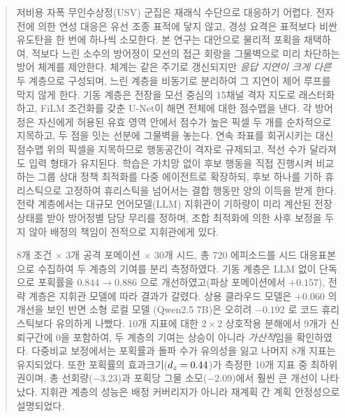 \begin{abstract}
\noindent
저비용 자폭 무인수상정(USV) 군집은 재래식 수단으로 대응하기 어렵다. 전자전에 의한 연성
대응은 유선 조종 표적에 닿지 않고, 경성 요격은 표적보다 비싼 유도탄을 한 번에 하나씩
소모한다. 본 연구는 대안으로 물리적 포획을 채택하여, 적보다 느린 소수의 방어정이 모선의
접근 회랑을 그물벽으로 미리 차단하는 방어 체계를 제안한다. 체계는 같은 주기로 갱신되지만
\emph{응답 지연이 크게 다른} 두 계층으로 구성되며, 느린 계층을 비동기로 분리하여 그 지연이
제어 루프를 막지 않게 한다. 기동 계층은 전장을 모선 중심의 15채널 격자 지도로 래스터화하고,
FiLM 조건화를 갖춘 U-Net이 해면 전체에 대한 점수맵을 낸다. 각 방어정은 자신에게 허용된
유효 영역 안에서 점수가 높은 픽셀 두 개를 순차적으로 지목하고, 두 점을 잇는 선분에
그물벽을 놓는다. 연속 좌표를 회귀시키는 대신 점수맵 위의 픽셀을 지목하므로 행동공간이
격자로 규제되고, 적선 수가 달라져도 입력 형태가 유지된다. 학습은 가치망 없이 후보 행동을
직접 진행시켜 비교하는 그룹 상대 정책 최적화를 다중 에이전트로 확장하되, 후보 하나를
기하 휴리스틱으로 고정하여 휴리스틱을 넘어서는 결합 행동만 양의 이득을 받게 한다. 전략 계층에서는 대규모
언어모델(LLM) 지휘관이 기하량이 미리 계산된 전장 상태를 받아 방어정별 담당 무리를 정하며,
조합 최적화에 의한 사후 보정을 두지 않아 배정의 책임이 전적으로 지휘관에게 있다.

\noindent
8개 조건 $\times$ 3개 공격 포메이션 $\times$ 30개 시드, 총 720 에피소드를 시드 대응표본으로
수집하여 두 계층의 기여를 분리 측정하였다. 기동 계층은 LLM 없이 단독으로 포획률을
$0.844 \to 0.886$ 으로 개선하였고(파상 포메이션에서 $+0.157$), 전략 계층은 지휘관 모델에
따라 결과가 갈렸다. 상용 클라우드 모델은 $+0.060$ 의 개선을 보인 반면 소형 로컬 모델
(Qwen2.5 7B)은 오히려 $-0.192$ 로 코드 휴리스틱보다 유의하게 나빴다. 10개 지표에 대한
$2\times2$ 상호작용 분해에서 9개가 신뢰구간에 0을 포함하여, 두 계층의 기여는 상승이 아니라
\emph{가산적}임을 확인하였다. 다중비교 보정에서는 포획률과 돌파 수가 유의성을 잃고 나머지
8개 지표는 유지되었다. 또한 포획률의 효과크기($\dz = 0.44$)가 측정한 10개 지표 중
최하위권이며, 총 선회량($-3.23$)과 포획당 그물 소모($-2.09$)에서 훨씬 큰 개선이 나타났다.
지휘관 계층의 성능은 배정 커버리지가 아니라 재계획 간 계획 안정성으로 설명되었다.
\end{abstract}
